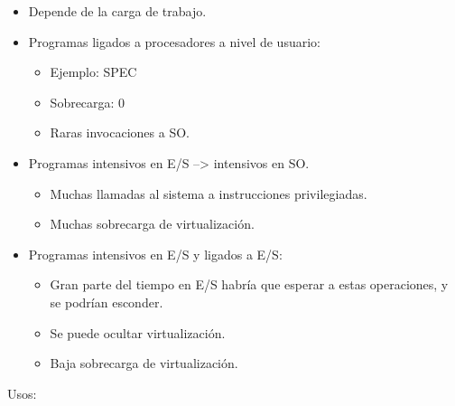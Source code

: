 \documentclass[12pt, twoside, openright]{report} %
\begin{document}
\begin{itemize}

	\item Depende de la carga de trabajo.
	\item Programas ligados a procesadores a nivel de usuario:

	      \begin{itemize}

		      \item Ejemplo: SPEC
		      \item Sobrecarga: 0
		      \item Raras invocaciones a SO.
	      \end{itemize}
	\item Programas intensivos en E/S --\textgreater{} intensivos en SO.

	      \begin{itemize}

		      \item Muchas llamadas al sistema a instrucciones privilegiadas.
		      \item Muchas sobrecarga de virtualización.
	      \end{itemize}
	\item Programas intensivos en E/S y ligados a E/S:

	      \begin{itemize}

		      \item Gran parte del tiempo en E/S habría que esperar a estas
		            operaciones, y se podrían esconder.
		      \item Se puede ocultar virtualización.
		      \item Baja sobrecarga de virtualización.
	      \end{itemize}
\end{itemize}

Usos:
\end{document}
